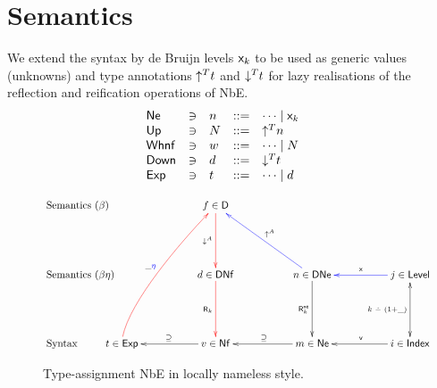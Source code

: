 \documentclass[acmlarge,review,anonymous]{acmart}\settopmatter{printfolios=true}
\begin{document}
\section{Semantics}
\label{sec:sem}

We extend the syntax by de Bruijn levels $\mathsf{x}_{k}$
to be used as generic values (unknowns) and type annotations
$\mathord{\uparrow^{T}} t$ and $\mathord{\downarrow^{T}} t$ for lazy realisations of the
reflection and reification operations of NbE.
\[
\begin{array}{lllrl@{\qquad}l}
  \Ne   & \ni & n & ::= & \dots \mid \lev k \\
  \tUp  & \ni & N & ::= & \up T n \\
  \Whnf & \ni & w & ::= & \dots \mid N \\
  \tDown & \ni & d & ::= & \down T t \\
  \Exp  & \ni & t & ::= & \dots \mid d \\
\end{array}
\]


\begin{figure}
$$
\xymatrix@R=12ex@C=12ex{
\mathrlap{\mbox{Semantics ($\beta$)}} &
  &                f \in \D   \ar@[red][d]_{\down A}
\\
\mathrlap{\mbox{Semantics ($\beta\eta$)}} &
  &                d \in \DNf \ar@[red][d]_{\tR_k{}}
  &                n \in \DNe \ar[d]_{\tRne_k} \ar@[blue][ul]_{\up A}
  & \ar@[blue][l]_{\var{}} j \in \Level \ar@{<->}[d]_{k\dotminus(1+\_)}
\\
\mathrlap{\mbox{Syntax}} &
t \in \Exp \ar@[red]@(u,dl)[uur]^{\_\color{blue}\eta} %
  & \ar[l]_{\supseteq}  v \in \Nf
  & \ar[l]_{\supseteq}  m \in \Ne
  & \ar[l]_{\ind{}}     i \in \Index
  &
}
$$
\caption{Type-assignment NbE in locally nameless
    style.\label{fig:typedchart}}
\end{figure}
\end{document}
